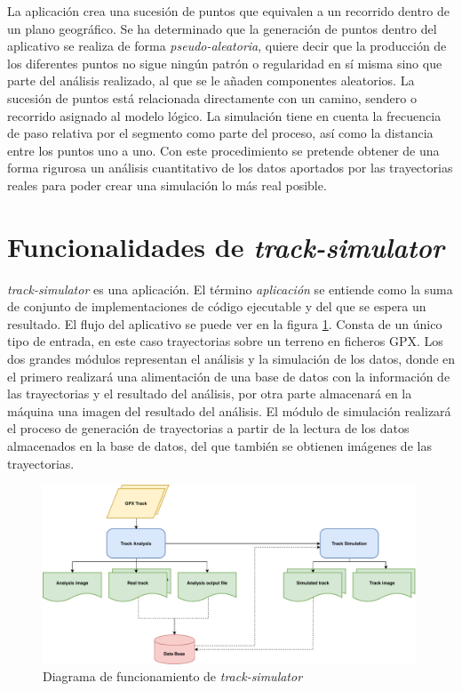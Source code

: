 La aplicación crea una sucesión de puntos que equivalen a un recorrido dentro de un 
plano geográfico. Se ha determinado que la generación de puntos dentro del aplicativo 
se realiza de forma \textit{pseudo-aleatoria}, quiere decir que la producción de los 
diferentes puntos no sigue ningún patrón o regularidad en sí misma sino que parte del 
análisis realizado, al que se le añaden componentes aleatorios. La sucesión de puntos 
está relacionada directamente con un camino, sendero o recorrido asignado al modelo 
lógico. La simulación tiene en cuenta la frecuencia de paso relativa por el segmento 
como parte del proceso, así como la distancia entre los puntos uno a uno. Con este 
procedimiento se pretende obtener de una forma rigurosa un análisis cuantitativo de 
los datos aportados por las trayectorias reales para poder crear una simulación lo más 
real posible.

\section{Funcionalidades de \textit{track-simulator}}
\textit{track-simulator} es una aplicación. El término \textit{aplicación} se entiende 
como la suma de conjunto de implementaciones  de código ejecutable y del que se 
espera un resultado. El flujo del aplicativo se puede ver en la figura 
\ref{figure:TrackSimulatorDiagramFlow}. Consta de un único tipo de entrada, en este 
caso trayectorias sobre un terreno en ficheros \ac{GPX}. Los dos grandes módulos 
representan el análisis y la simulación de los datos, donde en el primero realizará una 
alimentación de una base de datos con la información de las trayectorias y el resultado 
del análisis, por otra parte almacenará en la máquina una imagen del resultado del 
análisis. El módulo de simulación realizará el proceso de generación de trayectorias a 
partir de la lectura de los datos almacenados en la base de datos, del que también se 
obtienen imágenes de las trayectorias.
\begin{figure}[!htb]
\begin{center}
\includegraphics[width=0.99\textwidth]{./Imagenes/DiagramEng}
\caption{Diagrama de funcionamiento de \textit{track-simulator}}
\label{figure:TrackSimulatorDiagramFlow}
\end{center}
\end{figure}

